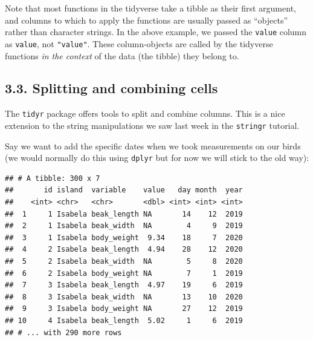 \documentclass[]{book}
\newenvironment{Shaded}{}{}
\newcommand{\CommentTok}[1]{\textcolor[rgb]{0.38,0.63,0.69}{\textit{#1}}}
\newcommand{\DataTypeTok}[1]{\textcolor[rgb]{0.56,0.13,0.00}{#1}}
\newcommand{\DecValTok}[1]{\textcolor[rgb]{0.25,0.63,0.44}{#1}}
\newcommand{\KeywordTok}[1]{\textcolor[rgb]{0.00,0.44,0.13}{\textbf{#1}}}
\newcommand{\NormalTok}[1]{#1}
\newcommand{\OperatorTok}[1]{\textcolor[rgb]{0.40,0.40,0.40}{#1}}
\newcommand{\OtherTok}[1]{\textcolor[rgb]{0.00,0.44,0.13}{#1}}
\newcommand{\StringTok}[1]{\textcolor[rgb]{0.25,0.44,0.63}{#1}}
\begin{document}
Note that most functions in the tidyverse take a tibble as their first argument, and columns to which to apply the functions are usually passed as ``objects'' rather than character strings. In the above example, we passed the \texttt{value} column as \texttt{value}, not \texttt{"value"}. These column-objects are called by the tidyverse functions \emph{in the context} of the data (the tibble) they belong to.

\hypertarget{splitting-and-combining-cells}{%
\subsection{3.3. Splitting and combining cells}\label{splitting-and-combining-cells}}

The \texttt{tidyr} package offers tools to split and combine columns. This is a nice extension to the string manipulations we saw last week in the \texttt{stringr} tutorial.

Say we want to add the specific dates when we took measurements on our birds (we would normally do this using \texttt{dplyr} but for now we will stick to the old way):

\begin{Shaded}
\end{Shaded}

\begin{verbatim}
## # A tibble: 300 x 7
##       id island  variable    value   day month  year
##    <int> <chr>   <chr>       <dbl> <int> <int> <int>
##  1     1 Isabela beak_length NA       14    12  2019
##  2     1 Isabela beak_width  NA        4     9  2019
##  3     1 Isabela body_weight  9.34    18     7  2020
##  4     2 Isabela beak_length  4.94    28    12  2020
##  5     2 Isabela beak_width  NA        5     8  2020
##  6     2 Isabela body_weight NA        7     1  2019
##  7     3 Isabela beak_length  4.97    19     6  2019
##  8     3 Isabela beak_width  NA       13    10  2020
##  9     3 Isabela body_weight NA       27    12  2019
## 10     4 Isabela beak_length  5.02     1     6  2019
## # ... with 290 more rows
\end{verbatim}
\end{document}
